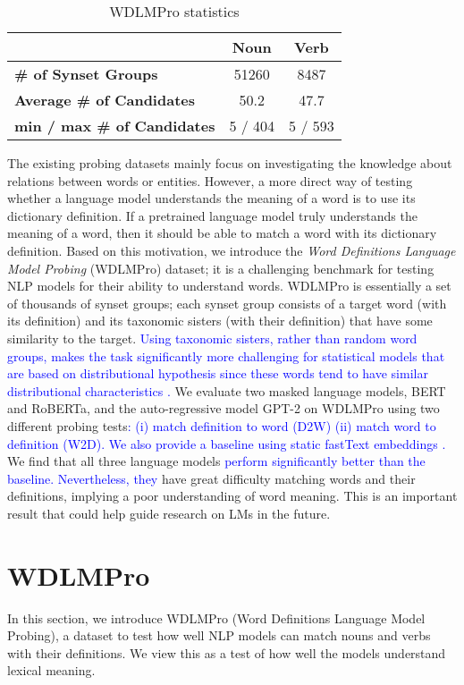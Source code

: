 \documentclass[11pt,a4paper]{article}
\begin{document}
\begin{table}
    \centering
    \begin{tabular}{l|cc}
    \hline
         & \textbf{Noun} & \textbf{Verb} \\ \hline
         \textbf{\# of Synset Groups} & 51260 & 8487 \\
         \textbf{Average \# of Candidates} & 50.2 & 47.7 \\
         \textbf{min / max \# of Candidates} & 5 / 404 & 5 / 593 \\ \hline
    \end{tabular}
    \caption{WDLMPro statistics}
    \label{tab:dataset_stats}
\end{table}

The existing probing datasets mainly focus on investigating
the knowledge about relations between words or
entities. However, a more direct way of testing whether a
language model understands the meaning of a word is to
use its dictionary definition. If a pretrained
language model truly understands the meaning of a word, then
it should be able to
match a word with its dictionary definition. 
Based on this motivation, we introduce the \textit{Word Definitions Language
  Model Probing} (WDLMPro) dataset; it is a challenging
benchmark for testing NLP models for their ability to
understand words.
WDLMPro is essentially a set of
thousands of synset groups; each synset group consists
of a target word (with its definition) and its taxonomic sisters
(with their definition) that have some similarity to the target. \textcolor{blue}{ Using taxonomic sisters, rather than random word groups, makes the task significantly more challenging for statistical models that are based on distributional hypothesis since these words tend to have similar distributional characteristics \cite{lenci08distributional}. }
We evaluate two masked language models, BERT and
RoBERTa, and the auto-regressive model GPT-2 on WDLMPro using two different probing tests\textcolor{blue}{: (i) match definition to word (D2W) (ii) match word to definition (W2D). We also provide a baseline using static fastText embeddings \cite{mikolov18fastText}.}
We find that all three language models \textcolor{blue}{perform significantly better than the baseline. Nevertheless, they} have great difficulty matching
words and their definitions, implying a poor understanding
of word meaning.
This is an important result that could
help guide research on LMs in the future.

\section{WDLMPro}
In this section,
we introduce  WDLMPro (Word Definitions Language Model
Probing), a dataset to test how well NLP models can match
nouns and verbs with  their
definitions.
We view this as a test of how well the models understand lexical meaning.
\end{document}
